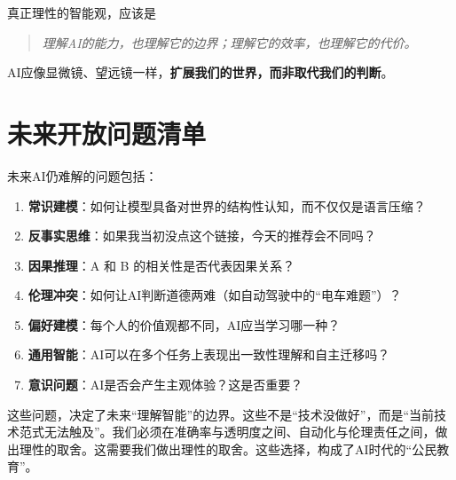 真正理性的智能观，应该是
\begin{quote}
\textit{理解AI的能力，也理解它的边界；理解它的效率，也理解它的代价。}
\end{quote}

AI应像显微镜、望远镜一样，\textbf{扩展我们的世界，而非取代我们的判断}。



\section{未来开放问题清单}

未来AI仍难解的问题包括：

\begin{enumerate}
\item \textbf{常识建模}：如何让模型具备对世界的结构性认知，而不仅仅是语言压缩？
\item \textbf{反事实思维}：如果我当初没点这个链接，今天的推荐会不同吗？
\item \textbf{因果推理}：A 和 B 的相关性是否代表因果关系？
\item \textbf{伦理冲突}：如何让AI判断道德两难（如自动驾驶中的“电车难题”）？
\item \textbf{偏好建模}：每个人的价值观都不同，AI应当学习哪一种？
\item \textbf{通用智能}：AI可以在多个任务上表现出一致性理解和自主迁移吗？
\item \textbf{意识问题}：AI是否会产生主观体验？这是否重要？
\end{enumerate}

这些问题，决定了未来“理解智能”的边界。这些不是“技术没做好”，而是“当前技术范式无法触及”。我们必须在准确率与透明度之间、自动化与伦理责任之间，做出理性的取舍。这需要我们做出理性的取舍。这些选择，构成了AI时代的“公民教育”。


\nocite{*}
\printbibliography[heading=bibintoc, title=\ebibname]

\newpage


